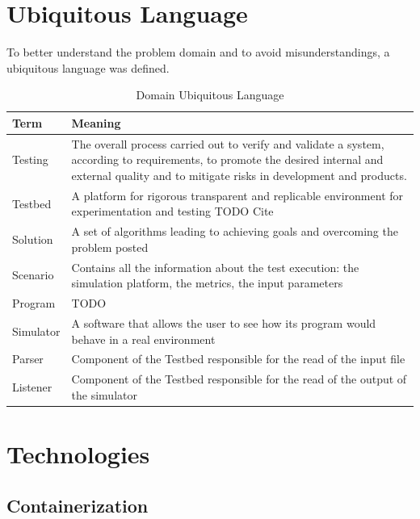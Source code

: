\documentclass[12pt,a4paper,openright,twoside]{book}
\begin{document}
\section{Ubiquitous Language}

To better understand the problem domain and to avoid misunderstandings, a ubiquitous language was defined.

\begin{table}[h]
    \centering
    \begin{tabular}{|l|p{}|}
    \toprule
    \textbf{Term} & \textbf{Meaning} \\
    \midrule                                                                                                                                                              
    Testing & The overall process carried out to verify and validate a system, according to requirements, to promote the desired internal and external quality and to mitigate risks in development and products. \\ \hline
    Testbed & A platform for rigorous transparent and replicable environment for experimentation and testing TODO Cite \\ \hline
    Solution & A set of algorithms leading to achieving goals and overcoming the problem posted \\ \hline
    Scenario & Contains all the information about the test execution: the simulation platform, the metrics, the input parameters \\ \hline
    Program & TODO \\ \hline
    Simulator & A software that allows the user to see how its program would behave in a real environment \\ \hline
    Parser & Component of the Testbed responsible for the read of the input file \\ \hline
    Listener & Component of the Testbed responsible for the read of the output of the simulator \\ \hline
    \end{tabular}
    \caption{Domain Ubiquitous Language}
    \end{table}

\section{Technologies}

\subsection{Containerization}
\end{document}
